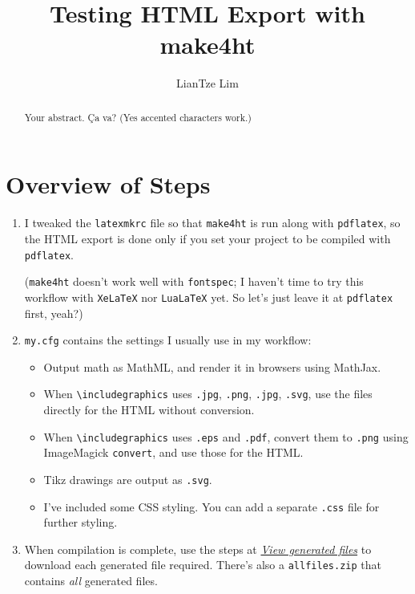 \documentclass[a4paper,11pt]{article}
\title{Testing HTML Export with make4ht}
\author{LianTze Lim}
\date{}
\begin{document}
\maketitle

\begin{abstract}
Your abstract. Ça va? (Yes accented characters work.)
\end{abstract}

\section{Overview of Steps}

\begin{enumerate}
\item I tweaked the \verb|latexmkrc| file so that \verb|make4ht| is run along with \verb|pdflatex|, so the HTML export is done only if you set your project to be compiled with \verb|pdflatex|.

(\verb|make4ht| doesn't work well with \verb|fontspec|; I haven't time to try this workflow with \verb|XeLaTeX| nor \verb|LuaLaTeX| yet. So let's just leave it at \verb|pdflatex| first, yeah?)

\item \verb|my.cfg| contains the settings I usually use in my workflow:
  \begin{itemize}
  \item Output math as MathML, and render it in browsers using MathJax.
  \item When \verb|\includegraphics| uses \verb|.jpg|, \verb|.png|, \verb|.jpg|, \verb|.svg|, use the files directly for the HTML without conversion.
  \item When \verb|\includegraphics| uses \verb|.eps| and \verb|.pdf|, convert them to \verb|.png| using ImageMagick \verb|convert|, and use those for the HTML.

  \item Tikz drawings are output as \verb|.svg|.
  
  \item I've included some CSS styling. You can add a separate \verb|.css| file for further styling.
  \end{itemize}
  
\item When compilation is complete, use the steps at \href{https://www.overleaf.com/learn/how-to/View_generated_files}{\emph{View generated files}} to download each generated file required. There's also a \texttt{allfiles.zip} that contains \emph{all} generated files.
\end{enumerate}
\end{document}
